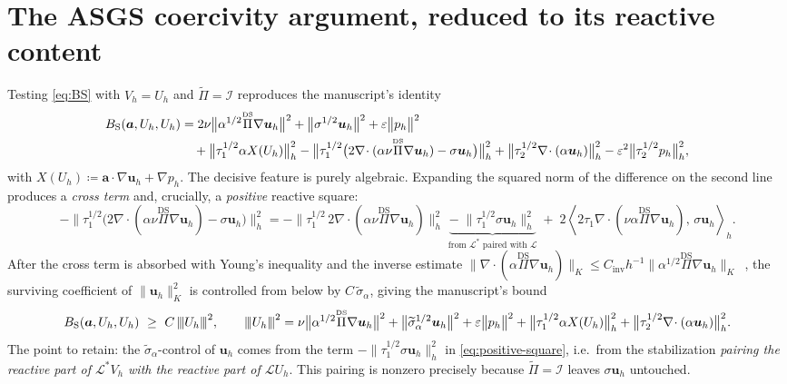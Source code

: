 \documentclass[11pt]{article}
\newcommand{\ViscProj}{\overset{\scriptscriptstyle{\text{DS}}}{\Pi}}
\newcommand{\triplenorm}[1]{{\left\vert\kern-0.25ex\left\vert\kern-0.25ex\left\vert #1
\right\vert\kern-0.25ex\right\vert\kern-0.25ex\right\vert}}
\newcommand{\dualpairing}[1]{\left\langle #1\right\rangle}
\theoremstyle{plain}
\theoremstyle{remark}
\newcommand{\uh}{\boldsymbol{u}_h}
\newcommand{\ph}{p_h}
\newcommand{\Uh}{U_h}
\newcommand{\Vh}{V_h}
\newcommand{\Porth}{\widetilde{\Pi}}                  %
\newcommand{\siga}{\widetilde{\sigma}_\alpha}
\begin{document}
\section{The ASGS coercivity argument, reduced to its reactive content}
Testing \cref{eq:BS} with $\Vh=\Uh$ and $\Porth=\mathcal{I}$ reproduces the
manuscript's identity
%
\begin{align}\label{eq:ASGS-expand}
  B_\text{S}(\boldsymbol{a},\Uh,\Uh)
  &= 2\nu\big\|\alpha^{1/2}\ViscProj\nabla\uh\big\|^2
   + \big\|\sigma^{1/2}\uh\big\|^2
   + \varepsilon\big\|\ph\big\|^2 \notag\\
  &\quad
   + \big\|\tau_1^{1/2}\alpha X(\Uh)\big\|_h^2
   - \big\|\tau_1^{1/2}\big(2\nabla\!\cdot(\alpha\nu\ViscProj\nabla\uh)-\sigma\uh\big)\big\|_h^2
   + \big\|\tau_2^{1/2}\nabla\!\cdot(\alpha\uh)\big\|_h^2
   - \varepsilon^2\big\|\tau_2^{1/2}\ph\big\|_h^2 ,
\end{align}
%
with $X(\Uh)\coloneqq\boldsymbol{a}\cdot\nabla\uh+\nabla\ph$. The decisive feature
is purely algebraic. Expanding the squared norm of the difference on the second
line produces a \emph{cross term} and, crucially, a \emph{positive} reactive
square:
%
\begin{equation}\label{eq:positive-square}
  -\big\|\tau_1^{1/2}\big(2\nabla\!\cdot(\alpha\nu\ViscProj\nabla\uh)-\sigma\uh\big)\big\|_h^2
  = -\big\|\tau_1^{1/2}\,2\nabla\!\cdot(\alpha\nu\ViscProj\nabla\uh)\big\|_h^2
    \;\underbrace{-\;\big\|\tau_1^{1/2}\sigma\uh\big\|_h^2}_{\text{from }\mathcal{L}^*\text{ paired with }\mathcal{L}}
    \;+\;2\dualpairing{2\tau_1\nabla\!\cdot(\nu\alpha\ViscProj\nabla\uh),\,\sigma\uh}_h .
\end{equation}
%
After the cross term is absorbed with Young's inequality and the inverse estimate
$\|\nabla\!\cdot(\alpha\ViscProj\nabla\uh)\|_K\le C_\text{inv}h^{-1}
\|\alpha^{1/2}\ViscProj\nabla\uh\|_K$~\cite{brenner2008mathematical}, the surviving
coefficient of $\|\uh\|_K^2$ is controlled from below by $C\,\siga$, giving the
manuscript's bound
%
\begin{equation}\label{eq:ASGS-lemma}
  B_\text{S}(\boldsymbol{a},\Uh,\Uh)\ \ge\ C\,\triplenorm{\Uh}^2,
  \qquad
  \triplenorm{\Uh}^2
  = \nu\big\|\alpha^{1/2}\ViscProj\nabla\uh\big\|^2
  + \big\|\siga^{1/2}\uh\big\|^2
  + \varepsilon\big\|\ph\big\|^2
  + \big\|\tau_1^{1/2}\alpha X(\Uh)\big\|_h^2
  + \big\|\tau_2^{1/2}\nabla\!\cdot(\alpha\uh)\big\|_h^2 .
\end{equation}
%
The point to retain: the $\siga$-control of $\uh$ comes from the term
$-\|\tau_1^{1/2}\sigma\uh\|_h^2$ in \cref{eq:positive-square}, i.e.\ from the
stabilization \emph{pairing the reactive part of $\mathcal{L}^*\Vh$ with the
reactive part of $\mathcal{L}\Uh$}. This pairing is nonzero precisely because
$\Porth=\mathcal{I}$ leaves $\sigma\uh$ untouched.
\end{document}
